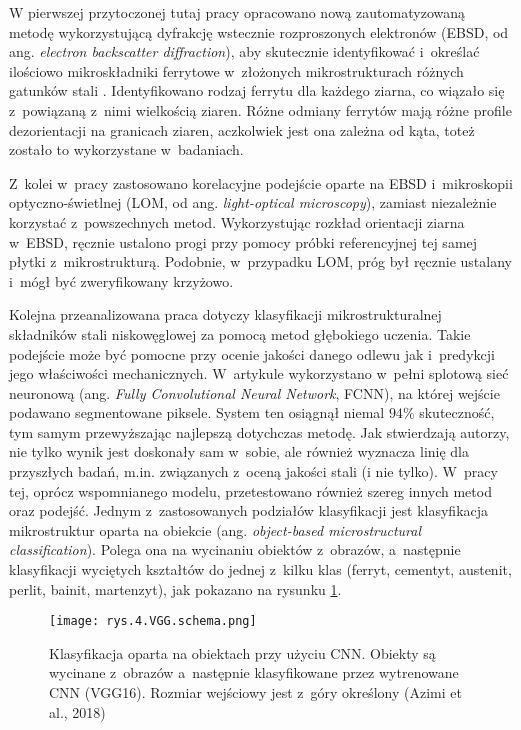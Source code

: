 W pierwszej przytoczonej tutaj pracy opracowano nową zautomatyzowaną metodę wykorzystującą dyfrakcję wstecznie rozproszonych elektronów (EBSD, od ang. \textit{electron backscatter diffraction}), aby skutecznie identyfikować i~określać ilościowo mikroskładniki ferrytowe w~złożonych mikrostrukturach różnych gatunków stali \cite{Shrestha13}. Identyfikowano rodzaj ferrytu dla każdego ziarna, co wiązało się z~powiązaną z~nimi wielkością ziaren. Różne odmiany ferrytów mają różne profile dezorientacji na granicach ziaren, aczkolwiek jest ona zależna od kąta, toteż zostało to wykorzystane w~badaniach.

Z~kolei w~pracy \cite{Britz17} zastosowano korelacyjne podejście oparte na EBSD i~mikroskopii optyczno-świetlnej (LOM, od ang. \textit{light-optical microscopy}), zamiast niezależnie korzystać z~powszechnych metod. Wykorzystując rozkład orientacji ziarna w~EBSD, ręcznie ustalono progi przy pomocy próbki referencyjnej tej samej płytki z~mikrostrukturą. Podobnie, w~przypadku LOM, próg był ręcznie ustalany i~mógł być zweryfikowany krzyżowo.

Kolejna przeanalizowana praca \cite{Azimi18} dotyczy klasyfikacji mikrostrukturalnej składników stali niskowęglowej za pomocą metod głębokiego uczenia. Takie podejście może być pomocne przy ocenie jakości danego odlewu jak i~predykcji jego właściwości mechanicznych. W~artykule wykorzystano w~pełni splotową sieć neuronową (ang. \textit{Fully Convolutional Neural Network}, FCNN), na której wejście podawano segmentowane piksele. System ten osiągnął niemal $94\%$ skuteczność, tym samym przewyższając najlepszą dotychczas metodę. Jak stwierdzają autorzy, nie tylko wynik jest doskonały sam w~sobie, ale również wyznacza linię dla przyszłych badań, m.in. związanych z~oceną jakości stali (i nie tylko). W~pracy tej, oprócz wspomnianego modelu, przetestowano również szereg innych metod oraz podejść. Jednym z~zastosowanych podziałów klasyfikacji jest klasyfikacja mikrostruktur oparta na obiekcie (ang. \textit{object-based microstructural classification}). Polega ona na wycinaniu obiektów z~obrazów, a~następnie klasyfikacji wyciętych kształtów do jednej z~kilku klas (ferryt, cementyt, austenit, perlit, bainit, martenzyt), jak pokazano na rysunku \ref{fig:mesh4}.  

\begin{figure}[h]
    \centering
    \texttt{[image: rys.4.VGG.schema.png]}
    \caption{Klasyfikacja oparta na obiektach przy użyciu CNN. Obiekty są wycinane z~obrazów a~następnie klasyfikowane przez wytrenowane CNN (VGG16). Rozmiar wejściowy jest z~góry określony (Azimi et al., 2018)}
    \label{fig:mesh4}
\end{figure}

